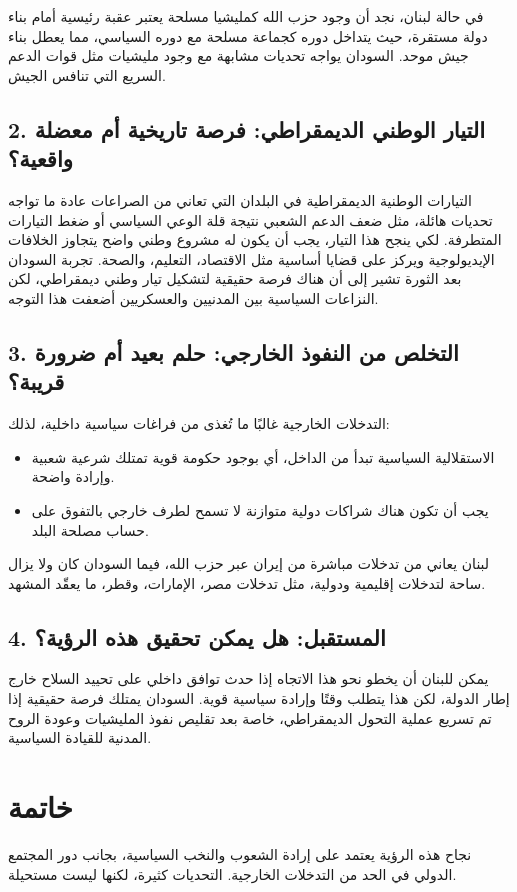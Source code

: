 \documentclass[12pt]{article}
\begin{document}
في حالة لبنان، نجد أن وجود حزب الله كمليشيا مسلحة يعتبر عقبة رئيسية أمام بناء دولة مستقرة، حيث يتداخل دوره كجماعة مسلحة مع دوره السياسي، مما يعطل بناء جيش موحد. السودان يواجه تحديات مشابهة مع وجود مليشيات مثل قوات الدعم السريع التي تنافس الجيش.

\subsection*{2. التيار الوطني الديمقراطي: فرصة تاريخية أم معضلة واقعية؟}
التيارات الوطنية الديمقراطية في البلدان التي تعاني من الصراعات عادة ما تواجه تحديات هائلة، مثل ضعف الدعم الشعبي نتيجة قلة الوعي السياسي أو ضغط التيارات المتطرفة. لكي ينجح هذا التيار، يجب أن يكون له مشروع وطني واضح يتجاوز الخلافات الإيديولوجية ويركز على قضايا أساسية مثل الاقتصاد، التعليم، والصحة. تجربة السودان بعد الثورة تشير إلى أن هناك فرصة حقيقية لتشكيل تيار وطني ديمقراطي، لكن النزاعات السياسية بين المدنيين والعسكريين أضعفت هذا التوجه.

\subsection*{3. التخلص من النفوذ الخارجي: حلم بعيد أم ضرورة قريبة؟}
التدخلات الخارجية غالبًا ما تُغذى من فراغات سياسية داخلية، لذلك:
\begin{itemize}
    \item الاستقلالية السياسية تبدأ من الداخل، أي بوجود حكومة قوية تمتلك شرعية شعبية وإرادة واضحة.
    \item يجب أن تكون هناك شراكات دولية متوازنة لا تسمح لطرف خارجي بالتفوق على حساب مصلحة البلد.
\end{itemize}

لبنان يعاني من تدخلات مباشرة من إيران عبر حزب الله، فيما السودان كان ولا يزال ساحة لتدخلات إقليمية ودولية، مثل تدخلات مصر، الإمارات، وقطر، ما يعقّد المشهد.

\subsection*{4. المستقبل: هل يمكن تحقيق هذه الرؤية؟}
يمكن للبنان أن يخطو نحو هذا الاتجاه إذا حدث توافق داخلي على تحييد السلاح خارج إطار الدولة، لكن هذا يتطلب وقتًا وإرادة سياسية قوية. السودان يمتلك فرصة حقيقية إذا تم تسريع عملية التحول الديمقراطي، خاصة بعد تقليص نفوذ المليشيات وعودة الروح المدنية للقيادة السياسية. 

\section*{خاتمة}
نجاح هذه الرؤية يعتمد على إرادة الشعوب والنخب السياسية، بجانب دور المجتمع الدولي في الحد من التدخلات الخارجية. التحديات كثيرة، لكنها ليست مستحيلة. 
\end{document}

